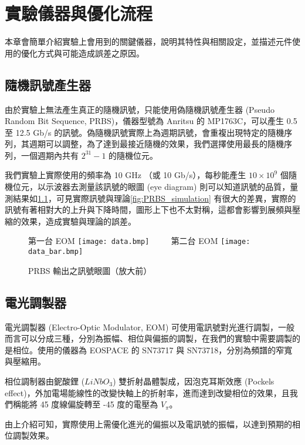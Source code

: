 \documentclass[class=NCU_thesis, crop=false]{standalone}
\begin{document}
\chapter{實驗儀器與優化流程}
本章會簡單介紹實驗上會用到的關鍵儀器，說明其特性與相關設定，並描述元件使用的優化方式與可能造成誤差之原因。

\section{隨機訊號產生器}
由於實驗上無法產生真正的隨機訊號，只能使用偽隨機訊號產生器 (Pseudo Random Bit Sequence, PRBS)，儀器型號為 Anritsu 的 MP1763C，可以產生 0.5 至 12.5 Gb/s 的訊號。偽隨機訊號實際上為週期訊號，會重複出現特定的隨機序列，其週期可以調整，為了達到最接近隨機的效果，我們選擇使用最長的隨機序列，一個週期內共有 $2^{31}-1$ 的隨機位元。

我們實驗上實際使用的頻率為 10 GHz （或 10 Gb/s），每秒能產生 $10\times 10^{9}$ 個隨機位元，以示波器去測量該訊號的眼圖 (eye diagram) 則可以知道訊號的品質，量測結果如\cref{fig:prbs_eye}，可見實際訊號與理論\cref{fig:PRBS_simulation} 有很大的差異，實際的訊號有著相對大的上升與下降時間，圖形上下也不太對稱，這都會影響到展頻與壓縮的效果，造成實驗與理論的誤差。

\begin{figure}[!hbt]
    \centering
    \subcaptionbox
        {第一台 EOM
        \label{fig:subfig_fig1}}
        {\texttt{[image: data.bmp]}}
    ~~~~
    \subcaptionbox
        {第二台 EOM
        \label{fig:subfig_fig2}}
        {\texttt{[image: data\_bar.bmp]}}
    \caption{PRBS 輸出之訊號眼圖（放大前）}
    \label{fig:prbs_eye}
\end{figure}

\section{電光調製器}
電光調製器 (Electro-Optic Modulator, EOM) 可使用電訊號對光進行調製，一般而言可以分成三種，分別為振幅、相位與偏振的調製，在我們的實驗中需要調製的是相位。使用的儀器為 EOSPACE 的 SN73717 與 SN73718，分別為頻譜的窄寬與壓縮用。

相位調制器由鈮酸鋰 ($LiNbO_{3}$) 雙折射晶體製成，因泡克耳斯效應 (Pockels effect)，外加電場能線性的改變快軸上的折射率，進而達到改變相位的效果，且我們稱能將 45 度線偏旋轉至 -45 度的電壓為 $V_{\pi}$。

由上介紹可知，實際使用上需優化進光的偏振以及電訊號的振幅，以達到預期的相位調製效果。
\end{document}
